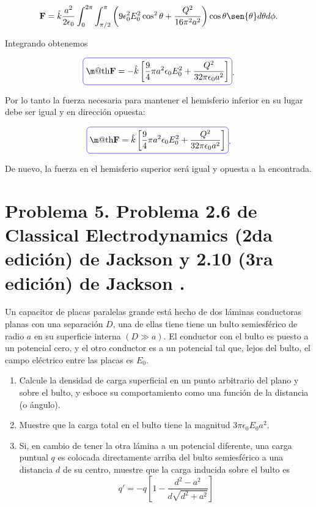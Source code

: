 \documentclass[a4paper,11pt]{article}
\makeatletter
\numberwithin{equation}{section}
\newcommand*{\boxcolor}{blue}
\renewcommand{\boxed}[1]{\textcolor{\boxcolor}{%
\tikz[baseline={([yshift=-1ex]current bounding box.center)}] \node [rectangle, minimum width=1ex,rounded corners,draw] {\normalcolor\m@th$\displaystyle#1$};}}
\makeatother
\begin{document}
\begin{equation}
 \mathbf{F} = \hat{k} \frac{a^2}{2\epsilon_0}\int_0^{2\pi} \int_{\pi/2}^\pi
 \left(9\epsilon_0^2E_0^2 \cos^2{\theta} 
 + \frac{Q^2}{16\pi^2a^2}\right)\cos{\theta}\sen{\theta}
 d\theta d\phi.
\end{equation}

Integrando obtenemos 

\begin{equation}
 \boxed{\mathbf{F} = - \hat{k}\left[\frac{9}{4}\pi a^2 \epsilon_0 E_0^2 +
 \frac{Q^2}{32\pi\epsilon_0 a^2}\right]}.
\end{equation}

Por lo tanto la fuerza necesaria para mantener el hemisferio inferior en su lugar 
debe ser igual y en dirección opuesta:

\begin{equation}
 \boxed{\mathbf{F} = \hat{k}\left[\frac{9}{4}\pi a^2 \epsilon_0 E_0^2 +
 \frac{Q^2}{32\pi\epsilon_0 a^2}\right]}.
\end{equation}

De nuevo, la fuerza en el hemisferio superior será igual y opuesta a la encontrada. 

\newpage

\section{Problema 5. Problema 2.6 de Classical Electrodynamics (2da edición) de Jackson 
\cite{jackson2} y 2.10 (3ra edición) de Jackson \cite{jackson3}.}

Un capacitor de placas paralelas grande está hecho de dos láminas conductoras 
planas con una separación $D$, una de ellas tiene tiene un bulto semiesférico 
de radio $a$ en su superficie interna $(D \gg a)$. El conductor con el bulto 
es puesto a un potencial cero, y el otro conductor es a un potencial tal que, 
lejos del bulto, el campo eléctrico entre las placas es $E_0$.

\begin{enumerate}[label=\textbf{(\alph*)}]
 \item Calcule la densidad de carga superficial en un punto arbitrario del 
 plano y sobre el bulto, y esboce su comportamiento como una función de la distancia 
 (o ángulo).
 \item Muestre que la carga total en el bulto tiene la magnitud $3\pi\epsilon_0E_0a^2$.
 \item Si, en cambio de tener la otra lámina a un potencial diferente, una carga 
 puntual $q$ es colocada directamente arriba del bulto semiesférico a una distancia 
 $d$ de su centro, muestre que la carga inducida sobre el bulto es 
 $$
 q' = -q\left[1 - \frac{d^2 - a^2}{d\sqrt{d^2 + a^2}} \right]
 $$
\end{enumerate}
\end{document}
